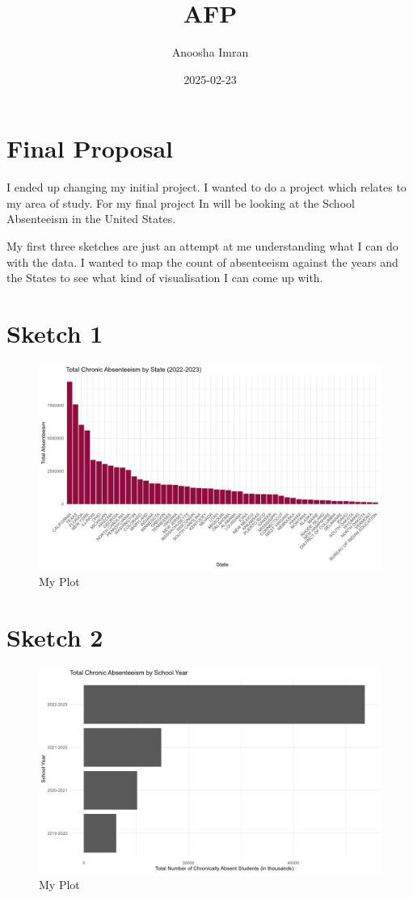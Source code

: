 \documentclass[
]{article}
\title{AFP}
\author{Anoosha Imran}
\date{2025-02-23}
\begin{document}
\maketitle

\section{Final Proposal}\label{final-proposal}

I ended up changing my initial project. I wanted to do a project which
relates to my area of study. For my final project In will be looking at
the School Absenteeism in the United States.

My first three sketches are just an attempt at me understanding what I
can do with the data. I wanted to map the count of absenteeism against
the years and the States to see what kind of visualisation I can come up
with.

\section{Sketch 1}\label{sketch-1}

\begin{figure}
\centering
\includegraphics{Sketch 1.png}
\caption{My Plot}
\end{figure}

\section{Sketch 2}\label{sketch-2}

\begin{figure}
\centering
\includegraphics{Sketch 2.png}
\caption{My Plot}
\end{figure}
\end{document}
